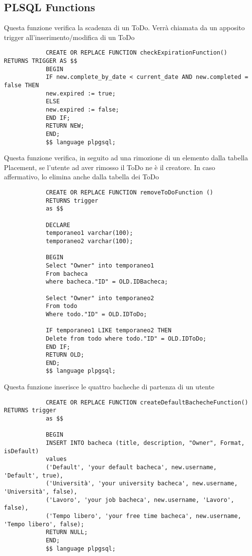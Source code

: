 \documentclass{article}
\begin{document}
		\subsection{PLSQL Functions}
		
		Questa funzione verifica la scadenza di un ToDo. Verrà chiamata da un apposito trigger all'inserimento/modifica di un ToDo
			\begin{lstlisting}
			CREATE OR REPLACE FUNCTION checkExpirationFunction() RETURNS TRIGGER AS $$
			BEGIN
			IF new.complete_by_date < current_date AND new.completed = false THEN
			new.expired := true;
			ELSE
			new.expired := false;
			END IF;
			RETURN NEW;
			END;
			$$ language plpgsql;
		\end{lstlisting}
		\hfill \linebreak[2]
		
		Questa funzione verifica, in seguito ad una rimozione di un elemento dalla tabella Placement, se l'utente ad aver rimosso il ToDo ne è il creatore. In caso affermativo, lo elimina anche dalla tabella dei ToDo
			\begin{lstlisting}
			CREATE OR REPLACE FUNCTION removeToDoFunction ()
			RETURNS trigger
			as $$
			
			DECLARE
			temporaneo1 varchar(100);
			temporaneo2 varchar(100);
			
			BEGIN
			Select "Owner" into temporaneo1
			From bacheca
			where bacheca."ID" = OLD.IDBacheca;
			
			Select "Owner" into temporaneo2
			From todo 
			Where todo."ID" = OLD.IDToDo;
			
			IF temporaneo1 LIKE temporaneo2 THEN
			Delete from todo where todo."ID" = OLD.IDToDo;
			END IF;
			RETURN OLD;
			END;
			$$ language plpgsql;
		\end{lstlisting}
		\hfill \linebreak[2]
		
		Questa funzione inserisce le quattro bacheche di partenza di un utente
			\begin{lstlisting}
			CREATE OR REPLACE FUNCTION createDefaultBachecheFunction() RETURNS trigger
			as $$
			
			BEGIN
			INSERT INTO bacheca (title, description, "Owner", Format, isDefault)
			values 
			('Default', 'your default bacheca', new.username, 'Default', true),
			('Università', 'your university bacheca', new.username, 'Università', false),
			('Lavoro', 'your job bacheca', new.username, 'Lavoro', false),
			('Tempo libero', 'your free time bacheca', new.username, 'Tempo libero', false);
			RETURN NULL;
			END;
			$$ language plpgsql;
		\end{lstlisting}
		\hfill \linebreak[2]
		
\end{document}
